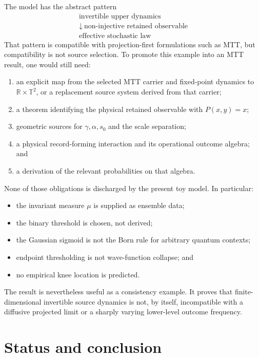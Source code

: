\documentclass[11pt]{article}
\newcommand{\T}{\mathbb{T}}
\begin{document}
The model has the abstract pattern
\[
\begin{array}{c}
\text{invertible upper dynamics}\\
\downarrow\ \text{non-injective retained observable}\\
\text{effective stochastic law}
\end{array}
\]
That pattern is compatible with projection-first formulations such as MTT, but compatibility is not source selection. To promote this example into an MTT result, one would still need:
\begin{enumerate}
\item an explicit map from the selected MTT carrier and fixed-point dynamics to
\(\mathbb{R}\times\T^2\), or a replacement source system derived from that carrier;
\item a theorem identifying the physical retained observable with \(P(x,y)=x\);
\item geometric sources for \(\gamma,\alpha,s_0\) and the scale separation;
\item a physical record-forming interaction and its operational outcome algebra; and
\item a derivation of the relevant probabilities on that algebra.
\end{enumerate}

None of those obligations is discharged by the present toy model. In particular:
\begin{itemize}
\item the invariant measure \(\mu\) is supplied as ensemble data;
\item the binary threshold is chosen, not derived;
\item the Gaussian sigmoid is not the Born rule for arbitrary quantum contexts;
\item endpoint thresholding is not wave-function collapse; and
\item no empirical knee location is predicted.
\end{itemize}

The result is nevertheless useful as a consistency example. It proves that finite-dimensional invertible source dynamics is not, by itself, incompatible with a diffusive projected limit or a sharply varying lower-level outcome frequency.

\section{Status and conclusion}
\end{document}
